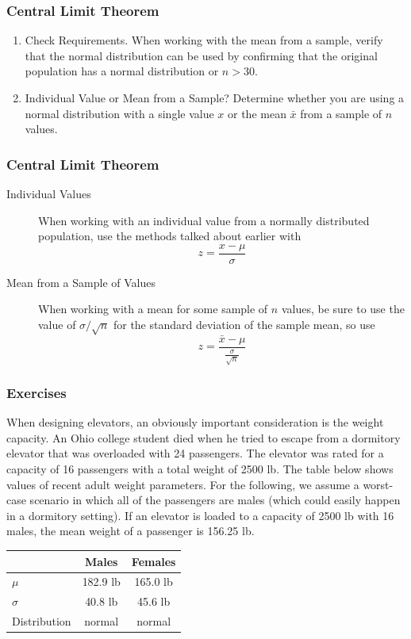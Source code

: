 \documentclass[xcolor=dvipsnames]{beamer}
\begin{document}
\begin{frame}
  \frametitle{Central Limit Theorem}
\begin{enumerate}
\item Check Requirements. When working with the mean from a sample,
  verify that the normal distribution can be used by confirming that
  the original population has a normal distribution or $n>30$. 
\item Individual Value or Mean from a Sample? Determine whether you
  are using a normal distribution with a single value $x$ or the mean
  $\bar{x}$ from a sample of $n$ values. 
\end{enumerate}
\end{frame}

\begin{frame}
  \frametitle{Central Limit Theorem}
\begin{description}
\item[Individual Values] When working with an individual value from a
  normally distributed population, use the methods talked about
  earlier with 
  \begin{equation}
    \label{eq:cohseiph}
    z=\frac{x-\mu}{\sigma}
  \end{equation}
\item[Mean from a Sample of Values] When working with a mean for some
  sample of $n$ values, be sure to use the value of $\sigma/\sqrt{n}$
  for the standard deviation of the sample mean, so use
  \begin{equation}
    \label{eq:euruighu}
    z=\frac{\bar{x}-\mu}{\frac{\sigma}{\sqrt{n}}}
  \end{equation}
\end{description}
\end{frame}

\begin{frame}
  \frametitle{Exercises} 
  {\ubung} When designing elevators, an obviously important
  consideration is the weight capacity. An Ohio college student died
  when he tried to escape from a dormitory elevator that was
  overloaded with 24 passengers. The elevator was rated for a capacity
  of 16 passengers with a total weight of 2500 lb. The table below
  shows values of recent adult weight parameters. For the following,
  we assume a worst-case scenario in which all of the passengers are
  males (which could easily happen in a dormitory setting). If an
  elevator is loaded to a capacity of 2500 lb with 16 males, the mean
  weight of a passenger is 156.25 lb.

\medskip

  \begin{tabular}{|l|c|c|}\hline
    & Males & Females \\ \hline
    $\mu$ & 182.9 lb & 165.0 lb \\ \hline
    $\sigma$ & 40.8 lb & 45.6 lb \\ \hline 
    Distribution & normal & normal \\ \hline
  \end{tabular}
\end{frame}
\end{document}
